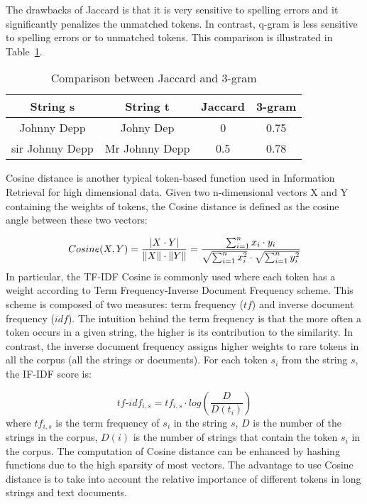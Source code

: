 The drawbacks of Jaccard is that it is very sensitive to spelling errors and it significantly penalizes  the unmatched tokens. In contrast, q-gram is less sensitive to spelling errors or to unmatched tokens. This comparison is illustrated in Table~\ref{tab:stringcomp}.

\begin{table}[H]
\footnotesize{
 \begin{center}
  \begin{tabular}{cccc}
  \hline
  String s & String t & Jaccard  & 3-gram \\
  \hline
  Johnny Depp & Johny Dep & 0 & 0.75\\
  \hline 
  sir Johnny Depp & Mr Johnny Depp & 0.5 & 0.78 \\
  \hline 
  \end{tabular}
  \caption{Comparison between Jaccard and 3-gram}
  \label{tab:stringcomp}
 \end{center}}
\end{table}

Cosine distance is another typical token-based function used in Information Retrieval for high dimensional data. Given two n-dimensional vectors X and Y containing the weights of tokens, the Cosine distance is defined as the cosine angle between these two vectors:

\begin{equation*}
 Cosine(X,Y)=\frac{|X \cdot Y|}{\left\lVert X\right\rVert \cdot \left\lVert Y\right\rVert} = \frac {\sum_{i=1}^{n} x_i \cdot y_i} {\sqrt{\sum_{i=1}^{n} x^{2}_i} \cdot \sqrt{\sum_{i=1}^{n} y^{2}_i}}
\end{equation*}
In particular, the TF-IDF Cosine is commonly used where each token has a weight according to Term Frequency-Inverse Document Frequency scheme. This scheme is composed of two measures: term frequency ($tf$) and  inverse document frequency ($idf$). The intuition behind the term frequency is that the more often a token occurs in a given string, the higher is its contribution to the similarity. In contrast, the inverse document frequency assigns higher weights to rare tokens in all the corpus (all the strings or documents). For each token $s_i$ from the string $s$, the IF-IDF score is:

\begin{equation*}
 tf\textrm{-}idf_{i,s}= tf_{i,s} \cdot log \left(\frac{D}{D(t_i)}\right)
\end{equation*}
where $tf_{i,s}$ is the term frequency of $s_i$ in the string $s$, $D$ is the number of the strings in the corpus, $D(i)$ is the number of strings that contain the token $s_i$ in the corpus. The computation of Cosine distance can be enhanced by hashing functions due to the high sparsity of most vectors. The advantage to use Cosine distance is to take into account the relative importance of different tokens in long strings and text documents.

